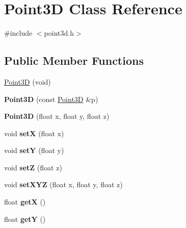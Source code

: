 \hypertarget{class_point3_d}{
\section{Point3D Class Reference}
\label{class_point3_d}
}


{\ttfamily \#include $<$point3d.h$>$}

\subsection*{Public Member Functions}
\begin{DoxyCompactItemize}
\item 
\hyperlink{class_point3_d_a4e65cd9031f66ffe6ed55102d4007128}{Point3D} (void)
\item 
\hypertarget{class_point3_d_a6781161506cdaa4a1425a57cab9b10ec}{
{\bfseries Point3D} (const \hyperlink{class_point3_d}{Point3D} \&p)}
\label{class_point3_d_a6781161506cdaa4a1425a57cab9b10ec}

\item 
\hypertarget{class_point3_d_a9a9cbd36f7da8cf5d5ee26ae341c1d90}{
{\bfseries Point3D} (float x, float y, float z)}
\label{class_point3_d_a9a9cbd36f7da8cf5d5ee26ae341c1d90}

\item 
\hypertarget{class_point3_d_ab4eeac67f15d8c07d508d4fa76b010b2}{
void {\bfseries setX} (float x)}
\label{class_point3_d_ab4eeac67f15d8c07d508d4fa76b010b2}

\item 
\hypertarget{class_point3_d_ac86480c69b4a32574f1339cea148f52e}{
void {\bfseries setY} (float y)}
\label{class_point3_d_ac86480c69b4a32574f1339cea148f52e}

\item 
\hypertarget{class_point3_d_aaefb320d17d263355e784cc4ec5912a9}{
void {\bfseries setZ} (float z)}
\label{class_point3_d_aaefb320d17d263355e784cc4ec5912a9}

\item 
\hypertarget{class_point3_d_ae9cf13cf431876d6048ac692652e2f4b}{
void {\bfseries setXYZ} (float x, float y, float z)}
\label{class_point3_d_ae9cf13cf431876d6048ac692652e2f4b}

\item 
\hypertarget{class_point3_d_a7f0dd2ed896a8d081232e11ce6d0ab60}{
float {\bfseries getX} ()}
\label{class_point3_d_a7f0dd2ed896a8d081232e11ce6d0ab60}

\item 
\hypertarget{class_point3_d_a7282c6b4c314622d37424d19fddeef53}{
float {\bfseries getY} ()}
\label{class_point3_d_a7282c6b4c314622d37424d19fddeef53}


\end{DoxyCompactItemize}
